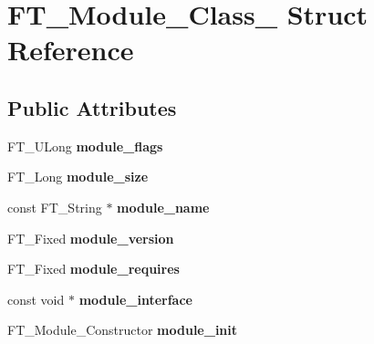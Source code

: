 \hypertarget{struct_f_t___module___class__}{}\section{F\+T\+\_\+\+Module\+\_\+\+Class\+\_\+ Struct Reference}
\label{struct_f_t___module___class__}
\subsection*{Public Attributes}
\begin{DoxyCompactItemize}
\item 
F\+T\+\_\+\+U\+Long {\bfseries module\+\_\+flags}\hypertarget{struct_f_t___module___class___a54a02a3767955cd8fa0cd786bd1f9515}{}\label{struct_f_t___module___class___a54a02a3767955cd8fa0cd786bd1f9515}

\item 
F\+T\+\_\+\+Long {\bfseries module\+\_\+size}\hypertarget{struct_f_t___module___class___a2582eeab364e4fbbd5d1e420bfcf3207}{}\label{struct_f_t___module___class___a2582eeab364e4fbbd5d1e420bfcf3207}

\item 
const F\+T\+\_\+\+String $\ast$ {\bfseries module\+\_\+name}\hypertarget{struct_f_t___module___class___af25b9e32b6c91e0c31560efb62886ed7}{}\label{struct_f_t___module___class___af25b9e32b6c91e0c31560efb62886ed7}

\item 
F\+T\+\_\+\+Fixed {\bfseries module\+\_\+version}\hypertarget{struct_f_t___module___class___a5b649f1965c42fd8c54bbc370fbf60b4}{}\label{struct_f_t___module___class___a5b649f1965c42fd8c54bbc370fbf60b4}

\item 
F\+T\+\_\+\+Fixed {\bfseries module\+\_\+requires}\hypertarget{struct_f_t___module___class___a24772981bd972d342f54a6e1704f85c3}{}\label{struct_f_t___module___class___a24772981bd972d342f54a6e1704f85c3}

\item 
const void $\ast$ {\bfseries module\+\_\+interface}\hypertarget{struct_f_t___module___class___a320168f227e2d268691429ac0c6b2900}{}\label{struct_f_t___module___class___a320168f227e2d268691429ac0c6b2900}

\item 
F\+T\+\_\+\+Module\+\_\+\+Constructor {\bfseries module\+\_\+init}\hypertarget{struct_f_t___module___class___a60f2bb9eee68366f20fe0613f347ffbd}{}\label{struct_f_t___module___class___a60f2bb9eee68366f20fe0613f347ffbd}


\end{DoxyCompactItemize}
